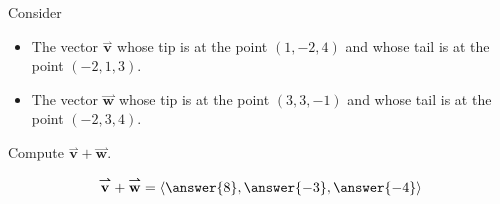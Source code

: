 \documentclass{ximera}
\author{Bart Snapp}
\begin{document}
\begin{exercise}
  Consider
  \begin{itemize}
    \item The vector $\overset{\boldsymbol{\rightharpoonup}}{\mathbf{v}}$ whose tip is at the point $(1,-2,4)$
      and whose tail is at the point $(-2,1,3)$.
    \item The vector $\overset{\boldsymbol{\rightharpoonup}}{\mathbf{w}}$ whose tip is at the point $(3,3,-1)$
      and whose tail is at the point $(-2,3,4)$.
  \end{itemize}
  Compute $\overset{\boldsymbol{\rightharpoonup}}{\mathbf{v}}+\overset{\boldsymbol{\rightharpoonup}}{\mathbf{w}}$.
  \begin{prompt}
    \[
    \overset{\boldsymbol{\rightharpoonup}}{\mathbf{v}} + \overset{\boldsymbol{\rightharpoonup}}{\mathbf{w}} = \left\langle \answer{8},\answer{-3},\answer{-4} \right\rangle
    \]
  \end{prompt}
\end{exercise}
\end{document}
